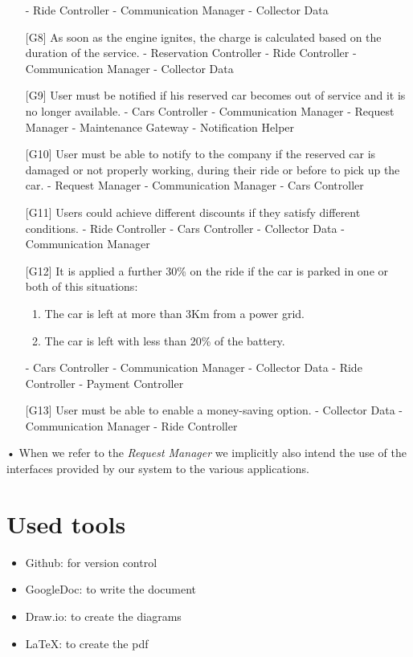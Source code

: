 \documentclass[10pt, a4paper,titlepage]{article}
\begin{document}
\begin{itemize}
\subitem - Ride Controller
\subitem - Communication Manager
\subitem - Collector Data
\item[{[G8]}] As soon as the engine ignites, the charge is calculated based on the duration of the service.
\subitem - Reservation Controller
\subitem - Ride Controller
\subitem - Communication Manager
\subitem - Collector Data
\item[{[G9]}] User must be notified if his reserved car becomes out of service and it is no longer available.
\subitem - Cars Controller
\subitem - Communication Manager
\subitem - Request Manager
\subitem - Maintenance Gateway
\subitem - Notification Helper
\item[{[G10]}] User must be able to notify to the company if the reserved car is damaged or not properly working, during their ride or before to pick up the car.
\subitem - Request Manager
\subitem - Communication Manager
\subitem - Cars Controller
\item[{[G11]}] Users could achieve different discounts if they satisfy different conditions.
\subitem - Ride Controller
\subitem - Cars Controller
\subitem - Collector Data
\subitem - Communication Manager
\item[{[G12]}] It is applied a further 30\% on the ride if the car is parked in one or both of this situations:
\begin{enumerate}
\item The car is left at more than 3Km from a power grid.
\item The car is left with less than 20\% of the battery.
\end{enumerate}
\subitem - Cars Controller
\subitem - Communication Manager
\subitem - Collector Data
\subitem - Ride Controller
\subitem - Payment Controller
\item[{[G13]}] User must be able to enable a money-saving option.
\subitem - Collector Data
\subitem - Communication Manager
\subitem - Ride Controller
\end{itemize}•
When we refer to the \emph{Request Manager} we implicitly also intend the use of the interfaces provided by our system to the various applications.
\section*{Used tools}
\begin{itemize}
\item Github: for version control
\item GoogleDoc: to write the document
\item Draw.io: to create the diagrams
\item \LaTeX: to create the pdf
\end{itemize}
\end{document}
